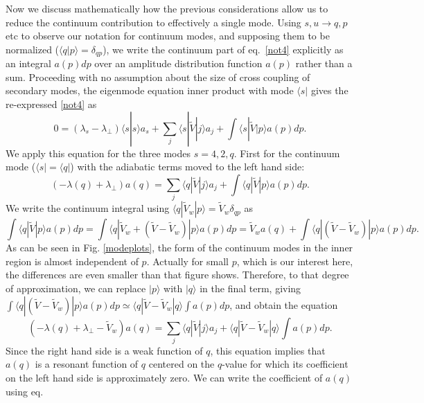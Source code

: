 \documentclass{jpp}
\def\ket#1{|#1\rangle}
\def\bra#1{\langle#1}
\begin{document}
Now we discuss mathematically how the previous considerations allow us
to reduce the continuum contribution to effectively a single mode.
Using $s,u\to q,p$ etc to observe our notation for continuum modes,
and supposing them to be normalized ($\bra{q}\ket{p}=\delta_{qp}$), we
write the continuum part of eq.\ \ref{not4} explicitly as an integral
$a(p)dp$ over an amplitude distribution function $a(p)$ rather than a
sum.  Proceeding with no assumption about the size of cross coupling
of secondary modes, the eigenmode equation inner product with mode
$\bra{s}|$ gives the re-expressed \ref{not4} as
\begin{equation}
  \label{eigengen}
  0=(\lambda_s-\lambda_\perp)\bra{s}\ket{s}a_s+\sum_j\bra{s}|\tilde{V}\ket{j}a_j
+\int\bra{s}|\tilde{V}\ket{p}a(p)dp.
\end{equation}
We apply this equation for the three modes $s=4,2,q$. First for the
continuum mode ($\bra{s}|=\bra{q}|$) with the adiabatic terms moved to
the left hand side:
\begin{equation}
  \label{eigqfirst}
  (-\lambda(q)+\lambda_\perp)a(q)=\sum_j\bra{q}|\tilde{V}\ket{j}a_j
+\int\bra{q}|\tilde V\ket{p} a(p)dp.
\end{equation}
We write the continuum integral using $\bra{q}|\tilde V_w\ket{p}=
\tilde V_w \delta_{qp}$ as 
\begin{equation}
  \label{contintegral}
  \int \bra{q}|\tilde{V}\ket{p}a(p)dp=\int\bra{q}|\tilde{V}_{w}+(\tilde{V}-\tilde{V}_{w})\ket{p}a(p)dp
  =\tilde{V}_{w}a(q) +\int\bra{q}|(\tilde{V}-\tilde{V}_{w})\ket{p}a(p)dp.
\end{equation}
As can be seen in Fig. \ref{modeplots}, the form of the continuum
modes in the inner region is almost independent of $p$. Actually for
small $p$, which is our interest here, the differences are even
smaller than that figure shows. Therefore, to that degree of
approximation, we can replace $\ket{p}$ with $\ket{q}$ in the final
term, giving $\int\bra{q}|(\tilde{V}-\tilde{V}_{w})\ket{p}a(p)dp\simeq
\bra{q}|\tilde{V}-\tilde{V}_{w}\ket{q}\int a(p)dp$, and obtain the
equation
\begin{equation}
  \label{eigq}
  (-\lambda(q)+\lambda_\perp-\tilde V_w)a(q)=\sum_j\bra{q}|\tilde{V}\ket{j}a_j
+\bra{q}|\tilde V-\tilde V_w\ket{q}\int a(p)dp.
\end{equation}
Since the right hand side is a weak function of $q$, this equation
implies that $a(q)$ is a resonant function of $q$ centered on the
$q$-value for which its coefficient on the left hand side is
approximately zero. We can write the coefficient of $a(q)$ using eq.\
\end{document}
